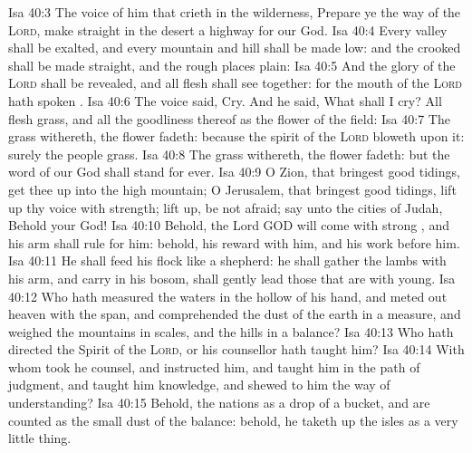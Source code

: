 \vs Isa 40:3 The voice of him that crieth in the wilderness, Prepare ye the way of the \textsc{Lord}, make straight in the desert a highway for our God.
\vs Isa 40:4 Every valley shall be exalted, and every mountain and hill shall be made low: and the crooked shall be made straight, and the rough places plain:
\vs Isa 40:5 And the glory of the \textsc{Lord} shall be revealed, and all flesh shall see  together: for the mouth of the \textsc{Lord} hath spoken .
\vs Isa 40:6 The voice said, Cry. And he said, What shall I cry? All flesh  grass, and all the goodliness thereof  as the flower of the field:
\vs Isa 40:7 The grass withereth, the flower fadeth: because the spirit of the \textsc{Lord} bloweth upon it: surely the people  grass.
\vs Isa 40:8 The grass withereth, the flower fadeth: but the word of our God shall stand for ever.
\vs Isa 40:9 O Zion, that bringest good tidings, get thee up into the high mountain; O Jerusalem, that bringest good tidings, lift up thy voice with strength; lift  up, be not afraid; say unto the cities of Judah, Behold your God!
\vs Isa 40:10 Behold, the Lord GOD will come with strong , and his arm shall rule for him: behold, his reward  with him, and his work before him.
\vs Isa 40:11 He shall feed his flock like a shepherd: he shall gather the lambs with his arm, and carry  in his bosom,  shall gently lead those that are with young.
\vs Isa 40:12 Who hath measured the waters in the hollow of his hand, and meted out heaven with the span, and comprehended the dust of the earth in a measure, and weighed the mountains in scales, and the hills in a balance?
\vs Isa 40:13 Who hath directed the Spirit of the \textsc{Lord}, or  his counsellor hath taught him?
\vs Isa 40:14 With whom took he counsel, and  instructed him, and taught him in the path of judgment, and taught him knowledge, and shewed to him the way of understanding?
\vs Isa 40:15 Behold, the nations  as a drop of a bucket, and are counted as the small dust of the balance: behold, he taketh up the isles as a very little thing.
